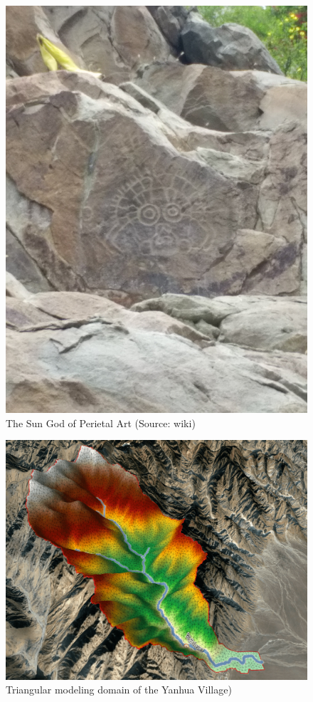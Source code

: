 \documentclass[]{scrbook}
\begin{document}
\begin{figure}
\centering
\includegraphics{Fig/Example/Yanhuacun/sun.jpg}
\caption{The Sun God of Perietal Art (Source: wiki)}
\end{figure}

\begin{figure}
\centering
\includegraphics{Fig/Example/Yanhuacun/map.png}
\caption{Triangular modeling domain of the Yanhua Village)}
\end{figure}
\end{document}

